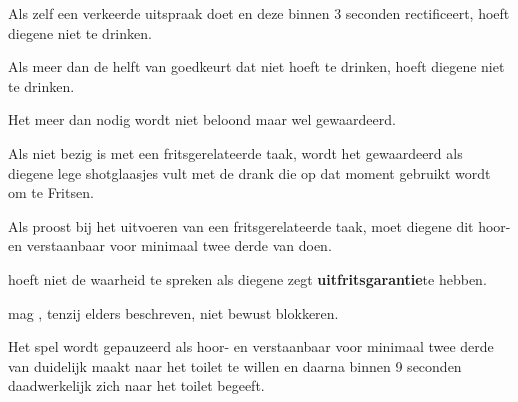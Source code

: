 \vervolgLijst{}
\item Als \eenSpeler zelf een verkeerde uitspraak doet en deze binnen 3 seconden rectificeert, hoeft diegene niet te drinken.
\eindLijst{}

\vervolgLijst{}
\item \label{regel:niet_hoeven_drinken} Als meer dan de helft van \alleSpelers goedkeurt dat \eenSpeler niet hoeft te drinken, hoeft diegene niet te drinken.
\eindLijst{}

\vervolgLijst{}
\item Het meer \Fritsen dan nodig wordt niet beloond maar wel gewaardeerd.
\eindLijst{}

\vervolgLijst{}
\item Als \eenSpeler niet bezig is met een fritsgerelateerde taak, wordt het gewaardeerd als diegene lege shotglaasjes vult met de drank die op dat moment gebruikt wordt om te Fritsen.
\eindLijst{}

\vervolgLijst{}
\item Als \eenSpeler proost bij het uitvoeren van een fritsgerelateerde taak, moet diegene dit hoor- en verstaanbaar voor minimaal twee derde van \alleSpelers doen.
\eindLijst{}

\vervolgLijst{}
\item \EenSpeler hoeft niet de waarheid te spreken als diegene zegt \textbf{uitfritsgarantie}\footnotemark[2] te hebben.
\eindLijst{}

\vervolgLijst{}
\item \EenSpeler mag \medeSpelersN, tenzij elders beschreven, niet bewust blokkeren.
\label{regel:speler_blokkeren}
\eindLijst{}

\footnotetext[1]{\footnoteFritsjeDesNemen}

\newpage
{}


\vervolgLijst{}
\item Het spel wordt gepauzeerd als \eenSpeler hoor- en verstaanbaar voor minimaal twee derde van \alleSpelers duidelijk maakt naar het toilet te willen en daarna binnen 9 seconden daadwerkelijk zich naar het toilet begeeft.
\label{regel:stilleggen_1}
\eindLijst{}

